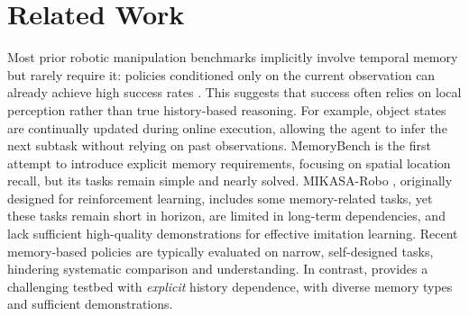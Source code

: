 \section{Related Work}
\label{sec:related_work}

Most prior robotic manipulation benchmarks \cite{liu2023libero, li24simpler, mees2022calvin, zhu2020robosuite} implicitly involve temporal memory but rarely require it: policies conditioned only on the current observation can already achieve high success rates \cite{pi05, wang2025vlaadaptor, dai2025aimbot}. This suggests that success often relies on local perception rather than true history-based reasoning. For example, object states are continually updated during online execution, allowing the agent to infer the next subtask without relying on past observations.
MemoryBench \cite{fang2025sam2act} is the first attempt to introduce explicit memory requirements, focusing on spatial location recall, but its tasks remain simple and nearly solved. MIKASA-Robo \cite{cherepanov2025memory}, originally designed for reinforcement learning, includes some memory-related tasks, yet these tasks remain short in horizon, are limited in long-term dependencies, and lack sufficient high-quality demonstrations for effective imitation learning.
Recent memory-based policies \cite{shi2025memoryvla, sridhar2025memer} are typically evaluated on narrow, self-designed tasks, hindering systematic comparison and understanding.
In contrast, \benchname\xspace provides a challenging testbed with \emph{explicit} history dependence, with diverse memory types and sufficient demonstrations.

